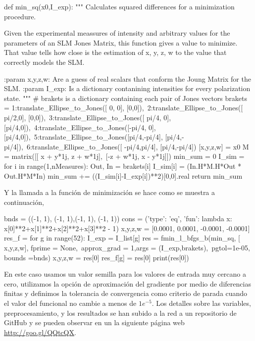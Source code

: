 \begin{python}
def min_sq(x0,I_exp):
    """ Calculates squared differences for a minimization procedure.

    Given the experimental meassures of intensity and arbitrary values for 
    the parameters of an SLM Jones Matrix, this function gives a value to
    minimize. That value tells how close is the estimation of x, y, z, w 
    to the value that correctly models the SLM.

    :param x,y,z,w: Are a guess of real scalars that conform the Joung Matrix for the SLM.
    :param I_exp: Is a dictionary contanining intensities for every polarization state.
    """
    # brakets is a dictionary containing each pair of Jones vectors
    brakets = {1:translate_Ellipse_to_Jones([ 0,   0],      [0,0]),\
           2:translate_Ellipse_to_Jones([ pi/2,0],      [0,0]),\
           3:translate_Ellipse_to_Jones([ pi/4, 0],    [pi/4,0]),\
           4:translate_Ellipse_to_Jones([-pi/4, 0],    [pi/4,0]),\
           5:translate_Ellipse_to_Jones([pi/4,-pi/4],   [pi/4,-pi/4]),\
           6:translate_Ellipse_to_Jones([ -pi/4,pi/4],  [pi/4,-pi/4])}
    [x,y,z,w] = x0
    M = matrix([[ x + y*1j, z + w*1j],\
                [-z + w*1j, x - y*1j]])
    min_sum = 0
    I_sim = {}
    for i in range(1,nMeasures):
        Out, In = brakets[i]
        I_sim[i] = (In.H*M.H*Out * Out.H*M*In)
        min_sum += ((I_sim[i]-I_exp[i])**2)[0,0].real    
    return min_sum
\end{python}
\pagebreak
Y la llamada a la función de minimización se hace como se muestra a
continuación,\\

\begin{python}
bnds = ((-1, 1), (-1, 1),(-1, 1), (-1, 1))
cons = ({'type': 'eq', 'fun': lambda x:  x[0]**2+x[1]**2+x[2]**2+x[3]**2 - 1})
x,y,z,w = [0.0001, 0.0001, -0.0001, -0.0001] 
res_f = {}
for g in range(52):
    I_exp = I_list[g]
    res = fmin_l_bfgs_b(min_sq, [ x,y,z,w], fprime = None,\
                         approx_grad = 1,args = (I_exp,brakets),\
                         pgtol=1e-05, bounds =bnds)
    x,y,z,w = res[0]
    res_f[g] = res[0]
    print(res[0])
\end{python}
En este caso usamos un valor semilla para los valores de entrada muy
cercano a cero, utilizamos la opción de aproximación del gradiente
por medio de diferencias finitas y definimos la tolerancia de
convergencia como criterio de parada cuando el valor del funcional no
cambie a menos de $1e^{-5}$. Los detalles sobre las variables,
preprocesamiento, y los resultados se han subido a la red a un
repositorio de GitHub y se pueden observar en un la siguiente página
web \href{http://goo.gl/QQtcQX}{http://goo.gl/QQtcQX}.

